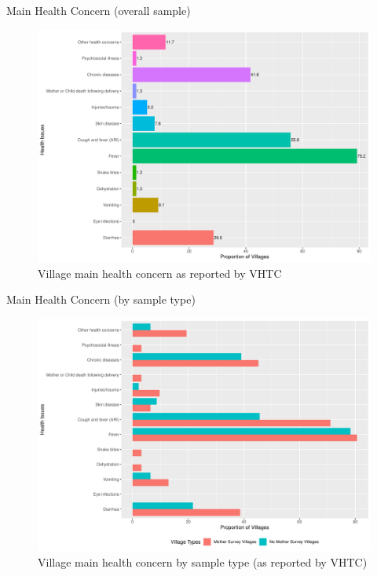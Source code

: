 \documentclass[
  ignorenonframetext,
]{beamer}
\begin{document}
\begin{frame}{Main Health Concern (overall sample)}
\protect\hypertarget{healthconcern}{}
\begin{figure}
\includegraphics[width=1\linewidth]{example_plots_files/figure-beamer/unnamed-chunk-6-1} \caption{Village main health concern as reported by VHTC}\label{fig:unnamed-chunk-6}
\end{figure}
\end{frame}

\begin{frame}{Main Health Concern (by sample type)}
\protect\hypertarget{main-health-concern-by-sample-type}{}
\begin{figure}
\includegraphics[width=1\linewidth]{example_plots_files/figure-beamer/unnamed-chunk-7-1} \caption{Village main health concern by sample type (as reported by VHTC)}\label{fig:unnamed-chunk-7}
\end{figure}
\end{frame}
\end{document}
